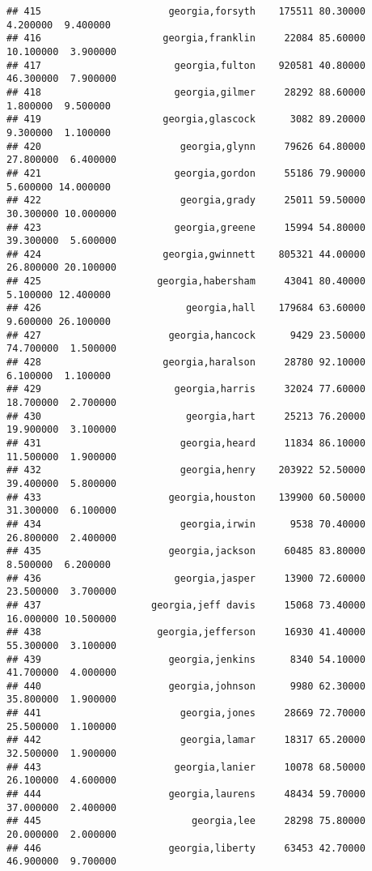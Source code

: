 \documentclass[
]{article}
\begin{document}
\begin{verbatim}
## 415                      georgia,forsyth    175511 80.30000  4.200000  9.400000
## 416                     georgia,franklin     22084 85.60000 10.100000  3.900000
## 417                       georgia,fulton    920581 40.80000 46.300000  7.900000
## 418                       georgia,gilmer     28292 88.60000  1.800000  9.500000
## 419                     georgia,glascock      3082 89.20000  9.300000  1.100000
## 420                        georgia,glynn     79626 64.80000 27.800000  6.400000
## 421                       georgia,gordon     55186 79.90000  5.600000 14.000000
## 422                        georgia,grady     25011 59.50000 30.300000 10.000000
## 423                       georgia,greene     15994 54.80000 39.300000  5.600000
## 424                     georgia,gwinnett    805321 44.00000 26.800000 20.100000
## 425                    georgia,habersham     43041 80.40000  5.100000 12.400000
## 426                         georgia,hall    179684 63.60000  9.600000 26.100000
## 427                      georgia,hancock      9429 23.50000 74.700000  1.500000
## 428                     georgia,haralson     28780 92.10000  6.100000  1.100000
## 429                       georgia,harris     32024 77.60000 18.700000  2.700000
## 430                         georgia,hart     25213 76.20000 19.900000  3.100000
## 431                        georgia,heard     11834 86.10000 11.500000  1.900000
## 432                        georgia,henry    203922 52.50000 39.400000  5.800000
## 433                      georgia,houston    139900 60.50000 31.300000  6.100000
## 434                        georgia,irwin      9538 70.40000 26.800000  2.400000
## 435                      georgia,jackson     60485 83.80000  8.500000  6.200000
## 436                       georgia,jasper     13900 72.60000 23.500000  3.700000
## 437                   georgia,jeff davis     15068 73.40000 16.000000 10.500000
## 438                    georgia,jefferson     16930 41.40000 55.300000  3.100000
## 439                      georgia,jenkins      8340 54.10000 41.700000  4.000000
## 440                      georgia,johnson      9980 62.30000 35.800000  1.900000
## 441                        georgia,jones     28669 72.70000 25.500000  1.100000
## 442                        georgia,lamar     18317 65.20000 32.500000  1.900000
## 443                       georgia,lanier     10078 68.50000 26.100000  4.600000
## 444                      georgia,laurens     48434 59.70000 37.000000  2.400000
## 445                          georgia,lee     28298 75.80000 20.000000  2.000000
## 446                      georgia,liberty     63453 42.70000 46.900000  9.700000

\end{verbatim}
\end{document}

